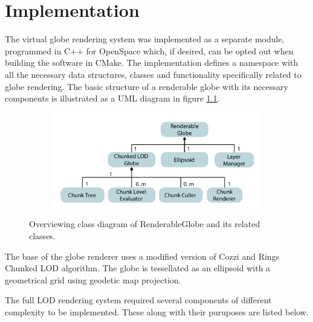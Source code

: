 \chapter{Implementation}
The virtual globe rendering system was implemented as a separate module, programmed in C++ for OpenSpace which, if desired, can be opted out when building the software in CMake. The implementation defines a namespace with all the necessary data structures, classes and functionality specifically related to globe rendering. The basic structure of a renderable globe with its necessary components is illustrated as a UML diagram in figure \ref{fig:renderableglobe}.

\begin{figure}[htbp]
    \centering
    \begin{subfigure}[bt]{0.8\textwidth}
        \includegraphics[width=\textwidth]{figures/implementation/renderable_globe.pdf}
    \end{subfigure}
    \caption{Overviewing class diagram of RenderableGlobe and its related classes.}
    \label{fig:renderableglobe}
\end{figure}

The base of the globe renderer uses a modified version of Cozzi and Rings Chunked LOD algorithm. The globe is tessellated as an ellipsoid with a geometrical grid using geodetic map projection.

The full LOD rendering system required several components of different complexity to be implemented. These along with their puruposes are listed below.

